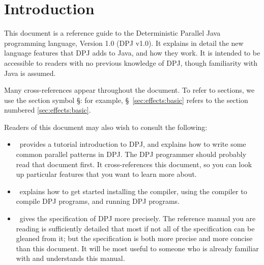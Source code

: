 \section{Introduction%
\label{sec:introduction}}

This document is a reference guide to the Deterministic Parallel Java
programming language, Version 1.0 (DPJ v1.0).  It explains in detail
the new language features that DPJ adds to Java, and how they work.
It is intended to be accessible to readers with no previous knowledge
of DPJ, though familiarity with Java is assumed.  

Many cross-references appear throughout the document.  To refer to
sections, we use the section symbol \S: for example,
\S~\ref{sec:effects:basic} refers to the section numbered
\ref{sec:effects:basic}.

Readers of this document may also wish to consult the following:
%
\begin{itemize}
%
\item \tutorial\ provides a tutorial introduction to DPJ, and
  explains how to write some common parallel patterns in DPJ.  The DPJ
  programmer should probably read that document first.  It
  cross-references this document, so you can look up particular
  features that you want to learn more about.
%
\item \installmanual\ explains how to get started installing the
   compiler, using the compiler to compile DPJ programs, and
  running DPJ programs.
%
\item \spec\ gives the specification of DPJ more precisely.  The
  reference manual you are reading is sufficiently detailed that most
  if not all of the specification can be gleaned from it; but the
  specification is both more precise and more concise than this
  document.  It will be most useful to someone who is already familiar
  with and understands this manual.
%
\end{itemize}

